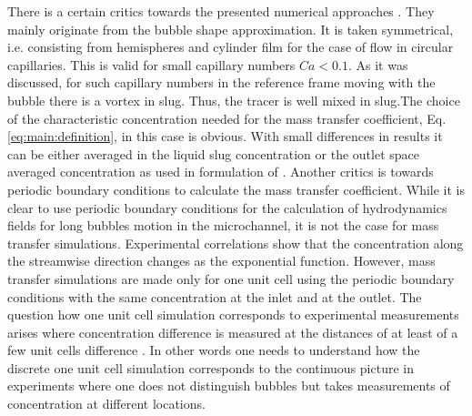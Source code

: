 \documentclass{article}
\begin{document}
There is a certain critics towards the presented numerical approaches \cite{vanbaten-circular,kreutzer-overview}. They mainly originate from the bubble shape approximation. It is taken symmetrical, i.e. consisting from hemispheres and cylinder film for the case of flow in circular capillaries. This is valid  for small capillary numbers $Ca<0.1$. As it was discussed, for such capillary numbers in the reference frame moving with the bubble there is a vortex in slug. Thus, the tracer is well mixed in slug.The choice of the characteristic concentration needed for the mass transfer coefficient, Eq. \ref{eq:main:definition}, in this case  is obvious. With small differences in results it can be either averaged in the liquid slug concentration or the outlet space averaged concentration as used in formulation of \citet{vanbaten-circular}. Another critics is towards periodic boundary conditions to calculate the mass transfer coefficient. While it is clear to use periodic boundary conditions for the calculation of hydrodynamics fields for  long bubbles motion in the microchannel, it is not the case for mass transfer simulations. Experimental correlations \cite{bercic-mass} show that the concentration along the streamwise direction changes as the exponential function. However, mass transfer simulations are made only for one unit cell using the periodic boundary conditions with the same concentration at the inlet and at the outlet. The question how  one unit cell simulation corresponds to experimental measurements arises where concentration difference is measured at the distances of at least of a few unit cells difference \cite{bercic-mass}. In other words one needs to understand how the discrete one unit cell simulation corresponds to the continuous picture in experiments where one does not distinguish bubbles but takes measurements of concentration at different locations.
\end{document}
